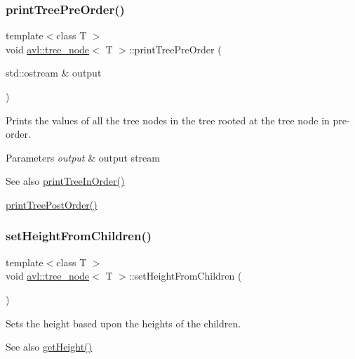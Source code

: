 \subsubsection{\texorpdfstring{print\+Tree\+Pre\+Order()}{printTreePreOrder()}}
{\footnotesize\ttfamily template$<$class T $>$ \\
void \hyperlink{classavl_1_1tree__node}{avl\+::tree\+\_\+node}$<$ T $>$\+::print\+Tree\+Pre\+Order (\begin{DoxyParamCaption}\item[{std\+::ostream \&}]{output }\end{DoxyParamCaption})}

Prints the values of all the tree nodes in the tree rooted at the tree node in pre-\/order. 
\begin{DoxyParams}{Parameters}
{\em output} & output stream \\
\hline
\end{DoxyParams}
\begin{DoxySeeAlso}{See also}
\hyperlink{classavl_1_1tree__node_a51af0430883561e9d3293cb63e78003c}{print\+Tree\+In\+Order()} 

\hyperlink{classavl_1_1tree__node_adb0751fd04db456d5afdbe5c898da41c}{print\+Tree\+Post\+Order()} 
\end{DoxySeeAlso}
\mbox{\label{classavl_1_1tree__node_a5e3b8788433571c4b8462d2cf2d689b9}} 
\subsubsection{\texorpdfstring{set\+Height\+From\+Children()}{setHeightFromChildren()}}
{\footnotesize\ttfamily template$<$class T $>$ \\
void \hyperlink{classavl_1_1tree__node}{avl\+::tree\+\_\+node}$<$ T $>$\+::set\+Height\+From\+Children (\begin{DoxyParamCaption}{ }\end{DoxyParamCaption})}

Sets the height based upon the heights of the children. \begin{DoxySeeAlso}{See also}
\hyperlink{classavl_1_1tree__node_ab298d8df03ff6414ff7280bbdbb16e8a}{get\+Height()} 
\end{DoxySeeAlso}
\mbox{\label{classavl_1_1tree__node_a21990bf288cf0ec0572e53afbacb9b35}} 
